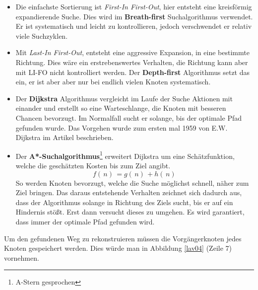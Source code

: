 	\begin{itemize}
		\item Die einfachste Sortierung ist \textit{First-In First-Out}, hier entsteht eine kreisförmig expandierende Suche. Dies wird im \textbf{Breath-first} Suchalgorithmus verwendet. Er ist systematisch und leicht zu kontrollieren, jedoch verschwendet er relativ viele Suchzyklen\cite[~S. 35]{Lav06}.
		\item Mit \textit{Last-In First-Out}, entsteht eine aggressive Expansion, in eine bestimmte Richtung. 
		Dies wäre ein erstrebenswertes Verhalten, die Richtung kann aber mit LI-FO nicht kontrolliert werden. Der \textbf{Depth-first} Algorithmus setzt das ein, er ist aber aber nur bei endlich vielen Knoten systematisch\cite[~S. 36]{Lav06}.
		\item Der \textbf{Dijkstra} Algorithmus vergleicht im Laufe der Suche Aktionen mit einander und erstellt so eine Warteschlange, die Knoten mit besseren Chancen bevorzugt. Im Normalfall sucht er solange, bis der optimale Pfad gefunden wurde. Das Vorgehen wurde zum ersten mal 1959 von E.W. Dijkstra im Artikel \cite{dijkstra:59} beschrieben.
		\item Der \textbf{A*-Suchalgorithmus}\footnote{A-Stern gesprochen} erweitert Dijkstra um eine Schätzfunktion, welche die geschätzten Kosten bis zum Ziel angibt.
		$$f( \, n ) \, = g ( \, n ) \, + h ( \, n ) \,$$
		So werden Knoten bevorzugt, welche die Suche möglichst schnell, näher zum Ziel bringen. Das daraus entstehende Verhalten zeichnet sich dadurch aus, dass der Algorithmus solange in Richtung des Ziels sucht, bis er auf ein Hindernis stößt. Erst dann versucht dieses zu umgehen. Es wird garantiert, dass immer der optimale Pfad gefunden wird.\cite[~S. 37]{Lav06}
	\end{itemize}
Um den gefundenen Weg zu rekonstruieren müssen die Vorgängerknoten jedes Knoten gespeichert werden. Dies würde man in Abbildung \ref{lav04} (Zeile 7) vornehmen. 


